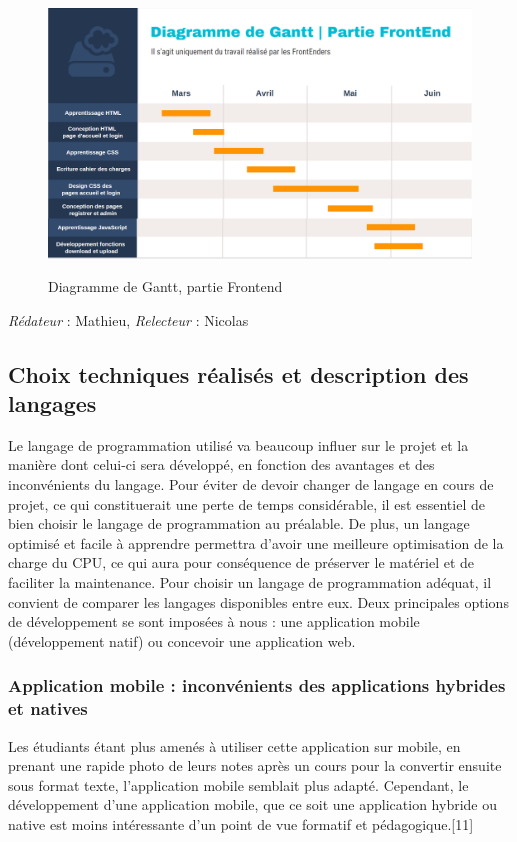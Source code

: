 \documentclass[oneside,a4paper,13pt]{article}
\begin{document}
\begin{center}
    \begin{figure}[H]
        \centering
        \includegraphics[scale=0.7]{Images/diagrammeGantt.png}
        \label{fig:neural_network}
        \caption{Diagramme de Gantt, partie Frontend}
    \end{figure}
\end{center}

\smallbreak\textit{Rédateur} : Mathieu, \textit{Relecteur} : Nicolas
\subsection{Choix techniques réalisés et description des langages}

Le langage de programmation utilisé va beaucoup influer sur le projet et la manière dont celui-ci sera développé, en fonction des avantages et des inconvénients du langage. Pour éviter de devoir changer de langage en cours de projet, ce qui constituerait une perte de temps considérable, il est essentiel de bien choisir le langage de programmation au préalable.  De plus, un langage optimisé et facile à apprendre permettra d’avoir une meilleure optimisation de la charge du CPU, ce qui aura pour conséquence de préserver le matériel et de faciliter la maintenance. Pour choisir un langage de programmation adéquat, il convient de comparer les langages disponibles entre eux. 
\smallbreak
Deux principales options de développement se sont imposées à nous :  une application mobile (développement natif) ou concevoir une application web.


\subsubsection{Application mobile : inconvénients des applications hybrides et natives}
Les étudiants étant plus amenés à utiliser cette application sur mobile, en prenant une rapide photo de leurs notes après un cours pour la convertir ensuite sous format texte, l’application mobile semblait plus adapté. 
Cependant, le développement d’une application mobile, que ce soit une application hybride ou native est moins intéressante d’un point de vue formatif et pédagogique.[11]
\bigbreak
\end{document}
